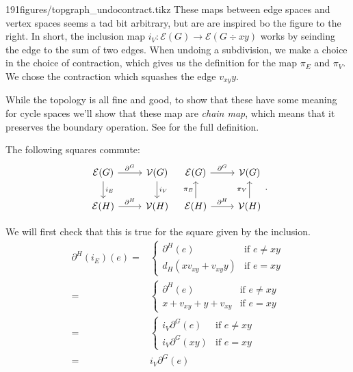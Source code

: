     
    \begin{paragraphfigureenv}{191figures/topgraph_undocontract.tikz}
    These maps between edge spaces and vertex spaces seems a tad bit arbitrary, but are are inspired bo the figure to the right. In short, the inclusion map $i_V: \mathcal E(G)\to \mathcal E(G\div xy)$ works by seinding the edge  to the sum of two edges. 
     When undoing a subdivision, we make a choice in the choice of contraction, which gives us the definition for the map $\pi_E$ and $\pi_V$. 
    We chose the contraction which squashes the edge $v_{xy}y$. 
    \end{paragraphfigureenv}
    While the topology is all fine and good, to show that these have some meaning for cycle spaces we'll show that these map are \emph{chain map}, which means that it preserves the boundary operation. See  for the full definition.
    \begin{claim} The following squares commute: \label{claim:graphchainmap}
     \[\begin{tikzcd}
    \mathcal E(G)\arrow{r}{\partial^G} \arrow{d}{i_E} & \mathcal V(G) \arrow{d}{i_V}\\
    \mathcal E(H)\arrow{r}{\partial^H} & \mathcal V(H)
    \end{tikzcd}\;\;\;\begin{tikzcd}
    \mathcal E(G)\arrow{r}{\partial^G}& \mathcal V(G) \\
    \mathcal E(H)\arrow{r}{\partial^H} \arrow{u}{\pi_E}  & \mathcal V(H) \arrow{u}{\pi_V}
    \end{tikzcd}.\]
    \end{claim}
    We will first check that this is true for the square given by the inclusion.\\
    \begin{align*}
    \partial^H(i_E)(e)=& \left\{\begin{array}{ll} \partial^H(e) & \text{if $e\neq xy$}\\  d_H(xv_{xy}+v_{xy}y) & \text{if $e=xy$}\end{array}\right.\\
    =& \left\{\begin{array}{ll} \partial^H(e) & \text{if $e\neq xy$}\\  x+v_{xy}+y+v_{xy} & \text{if $e=xy$}\end{array}\right.\\=& \left\{\begin{array}{ll} i_V\partial^G(e) & \text{if $e\neq xy$}\\  i_V\partial^G(xy) & \text{if $e=xy$}\end{array}\right.\\
    =&i_V\partial^G(e)
    \end{align*}
